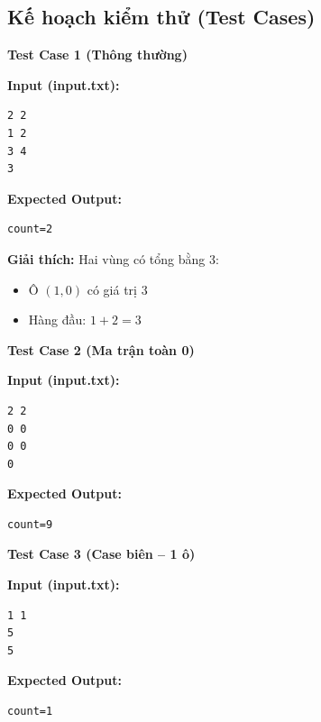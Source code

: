 \subsection{Kế hoạch kiểm thử (Test Cases)}

\textbf{Test Case 1 (Thông thường)}

\textbf{Input (input.txt):}
\begin{lstlisting}
2 2
1 2
3 4
3
\end{lstlisting}

\textbf{Expected Output:}
\begin{lstlisting}
count=2
\end{lstlisting}

\vspace{0.5cm}

\textbf{Giải thích:}
Hai vùng có tổng bằng 3:
\begin{itemize}
    \item Ô $(1,0)$ có giá trị 3
    \item Hàng đầu: $1 + 2 = 3$
\end{itemize}

\vspace{0.5cm}

\textbf{Test Case 2 (Ma trận toàn 0)}

\textbf{Input (input.txt):}
\begin{lstlisting}
2 2
0 0
0 0
0
\end{lstlisting}

\textbf{Expected Output:}
\begin{lstlisting}
count=9
\end{lstlisting}

\vspace{0.5cm}

\textbf{Test Case 3 (Case biên -- 1 ô)}

\textbf{Input (input.txt):}
\begin{lstlisting}
1 1
5
5
\end{lstlisting}

\textbf{Expected Output:}
\begin{lstlisting}
count=1
\end{lstlisting}